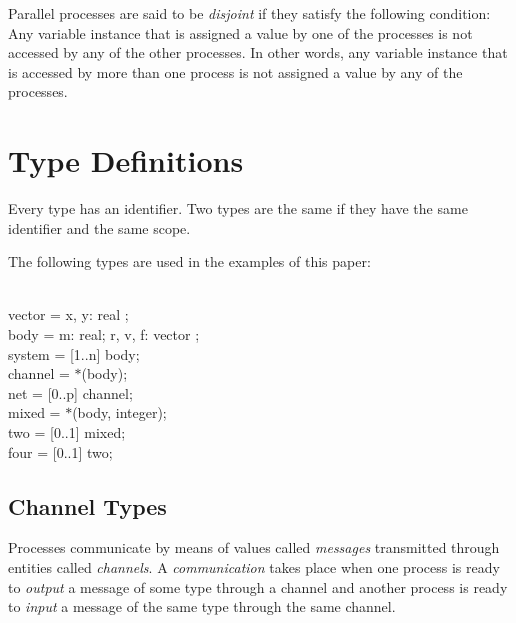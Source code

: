 Parallel processes are said to be {\it disjoint} if they
satisfy the following condition: Any variable instance that
is assigned a value by one of the processes is not
accessed by any of the other processes. In other words, any
variable instance that is accessed by more than one process
is not assigned a value by any of the processes.


\section{Type Definitions}

Every type has an identifier. Two types are the same if they
have the same identifier and the same scope.

\blankline

\examples

\blankline

The following types are used in the examples of this paper:

\begin{program}{20.4em}
  {\PA}{\Type}                                            \\
    {\PB}vector = {\Record} x, y: real {\End};            \\
    {\PB}body = {\Record} m: real; r, v, f: vector {\End};\\
    {\PB}system = {\Array} [1..n] {\Of} body;             \\
    {\PB}channel = $*$(body);                             \\
    {\PB}net = {\Array} [0..p] {\Of} channel;             \\
    {\PB}mixed = $*$(body, integer);                      \\
    {\PB}two = {\Array} [0..1] {\Of} mixed;               \\
    {\PB}four = {\Array} [0..1] {\Of} two;
\end{program}


\subsection{Channel Types}

Processes communicate by means of values called {\it
messages} transmitted through entities called {\it
channels}. A {\it communication} takes place when one
process is ready to {\it output} a message of some type
through a channel and another process is ready to {\it
input} a message of the same type through the same channel.

